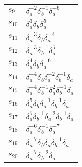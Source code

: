 \documentclass{article}
\begin{document}
\begin{center}
\begin{tabular}{ll}
$s_{9}$ & $\delta_a^{-2}\delta_b^{-1}\delta_a^{-6}$ \\
$s_{10}$ & $\delta_a^{3}\delta_b^{}\delta_a^{5}$ \\
$s_{11}$ & $\delta_a^{-3}\delta_b^{}\delta_a^{-4}$ \\
$s_{12}$ & $\delta_a^{-3}\delta_b^{-1}\delta_a^{5}$ \\
$s_{13}$ & $\delta_a^{4}\delta_b^{}\delta_a^{-6}$ \\
$s_{14}$ & $\delta_a^{-4}\delta_b^{}\delta_a^{-2}\delta_b^{-1}\delta_a^{}$ \\
$s_{15}$ & $\delta_a^{-4}\delta_b^{-1}\delta_a^{2}\delta_b^{-1}\delta_a^{}$ \\
$s_{16}$ & $\delta_a^{5}\delta_b^{}\delta_a^{-1}\delta_b^{-1}\delta_a^{}$ \\
$s_{17}$ & $\delta_a^{5}\delta_b^{-1}\delta_a^{-2}\delta_b^{-1}\delta_a^{}$ \\
$s_{18}$ & $\delta_a^{-6}\delta_b^{-1}\delta_a^{-7}$ \\
$s_{19}$ & $\delta_a^{-7}\delta_b^{}\delta_a^{}\delta_b^{-1}\delta_a^{}$ \\
$s_{20}$ & $\delta_a^{-7}\delta_b^{-2}\delta_a^{}$ \\
\bottomrule
\end{tabular}
\end{center}

\thispagestyle{empty}
\end{document}

